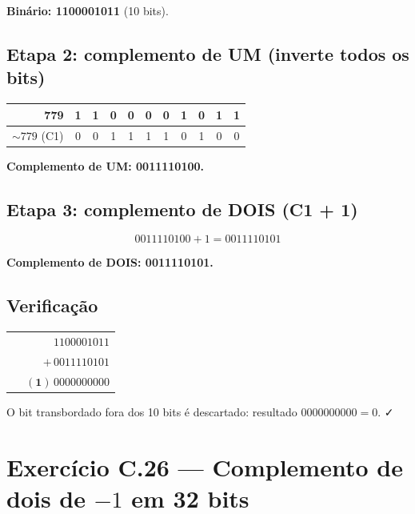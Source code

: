 \documentclass[11pt,a4paper]{article}
\begin{document}
\begin{resposta}\textbf{Bin\'ario: 1100001011} (10 bits).\end{resposta}

\subsection*{Etapa 2: complemento de UM (inverte todos os bits)}

\begin{center}
\begin{tabular}{r|cccccccccc}
779             & 1 & 1 & 0 & 0 & 0 & 0 & 1 & 0 & 1 & 1 \\
\hline
$\sim 779$ (C1) & 0 & 0 & 1 & 1 & 1 & 1 & 0 & 1 & 0 & 0
\end{tabular}
\end{center}

\begin{resposta}\textbf{Complemento de UM: 0011110100.}\end{resposta}

\subsection*{Etapa 3: complemento de DOIS (C1 + 1)}

\[
0011110100 + 1 = 0011110101
\]

\begin{resposta}\textbf{Complemento de DOIS: 0011110101.}\end{resposta}

\subsection*{Verifica\c{c}\~ao}

\begin{center}
\begin{tabular}{r}
$\phantom{+}1100001011$ \\
$+ \, 0011110101$ \\
\hline
$\phantom{+}\mathbf{(1)}\,0000000000$
\end{tabular}
\end{center}

O bit transbordado fora dos 10 bits \'e descartado: resultado $0000000000 = 0$. ✓

\section{Exerc\'icio C.26 --- Complemento de dois de $-1$ em 32 bits}
\end{document}
